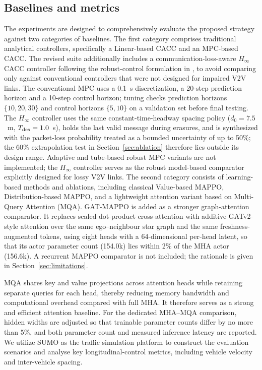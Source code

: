 \documentclass{ieeeaccess}
\begin{document}
\subsection{Baselines and metrics}
The experiments are designed to comprehensively evaluate the proposed strategy against two categories of baselines. The first category comprises traditional analytical controllers, specifically a Linear-based CACC and an MPC-based CACC. The revised suite additionally includes a communication-loss-aware $H_\infty$ CACC controller following the robust-control formulation in \cite{YANG2025103212}, to avoid comparing only against conventional controllers that were not designed for impaired V2V links. The conventional MPC uses a 0.1~s discretization, a 20-step prediction horizon and a 10-step control horizon; tuning checks prediction horizons $\{10,20,30\}$ and control horizons $\{5,10\}$ on a validation set before final testing. %
The $H_\infty$ controller uses the same constant-time-headway spacing policy ($d_0=7.5$~m, $T_{\rm des}=1.0$~s), holds the last valid message during erasures, and is synthesized with the packet-loss probability treated as a bounded uncertainty of up to 50\%; the 60\% extrapolation test in Section~\ref{sec:ablation} therefore lies outside its design range. Adaptive and tube-based robust MPC variants are not implemented; the $H_\infty$ controller serves as the robust model-based comparator explicitly designed for lossy V2V links. %
The second category consists of learning-based methods and ablations, including classical Value-based MAPPO, Distribution-based MAPPO, and a lightweight attention variant based on Multi-Query Attention (MQA). GAT-MAPPO is added as a stronger graph-attention comparator. It replaces scaled dot-product cross-attention with additive GATv2-style attention over the same ego--neighbour star graph and the same freshness-augmented tokens, using eight heads with a 64-dimensional per-head latent, so that its actor parameter count (154.0k) lies within 2\% of the MHA actor (156.6k). A recurrent MAPPO comparator is not included; the rationale is given in Section~\ref{sec:limitations}. %

MQA shares key and value projections across attention heads while retaining separate queries for each head, thereby reducing memory bandwidth and computational overhead compared with full MHA. It therefore serves as a strong and efficient attention baseline. For the dedicated MHA--MQA comparison, hidden widths are adjusted so that trainable parameter counts differ by no more than 5\%, and both parameter count and measured inference latency are reported. %
We utilize SUMO as the traffic simulation platform to construct the evaluation scenarios and analyse key longitudinal-control metrics, including vehicle velocity and inter-vehicle spacing.
\end{document}
